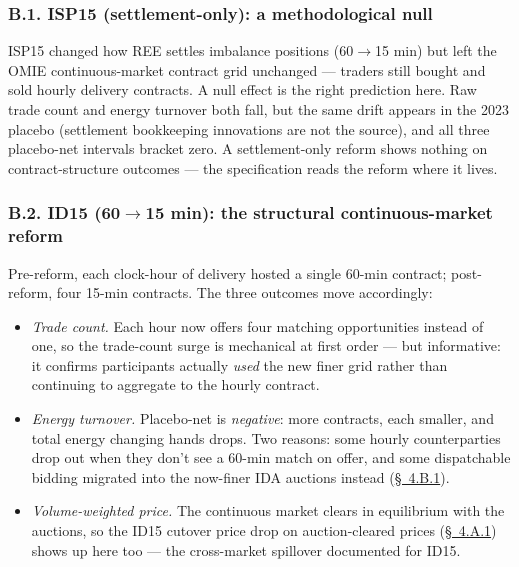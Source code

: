 \documentclass[11pt]{article}
\begin{document}
\subsubsection*{B.1. ISP15 (settlement-only): a methodological null}
ISP15 changed how REE settles imbalance positions (60$\to$15 min) but left the OMIE continuous-market contract grid unchanged --- traders still bought and sold hourly delivery contracts. A null effect is the right prediction here. Raw trade count and energy turnover both fall, but the same drift appears in the 2023 placebo (settlement bookkeeping innovations are not the source), and all three placebo-net intervals bracket zero. A settlement-only reform shows nothing on contract-structure outcomes --- the specification reads the reform where it lives.

\subsubsection*{B.2. ID15 (60$\to$15 min): the structural continuous-market reform}
Pre-reform, each clock-hour of delivery hosted a single 60-min contract; post-reform, four 15-min contracts. The three outcomes move accordingly:
\begin{itemize}\setlength{\itemsep}{1pt}
\item \emph{Trade count.} Each hour now offers four matching opportunities instead of one, so the trade-count surge is mechanical at first order --- but informative: it confirms participants actually \emph{used} the new finer grid rather than continuing to aggregate to the hourly contract.
\item \emph{Energy turnover.} Placebo-net is \emph{negative}: more contracts, each smaller, and total energy changing hands drops. Two reasons: some hourly counterparties drop out when they don't see a 60-min match on offer, and some dispatchable bidding migrated into the now-finer IDA auctions instead (\hyperref[sec:4v]{\S~4.B.1}).
\item \emph{Volume-weighted price.} The continuous market clears in equilibrium with the auctions, so the ID15 cutover price drop on auction-cleared prices (\hyperref[sec:4ii]{\S~4.A.1}) shows up here too --- the cross-market spillover documented for ID15.
\end{itemize}
\end{document}
